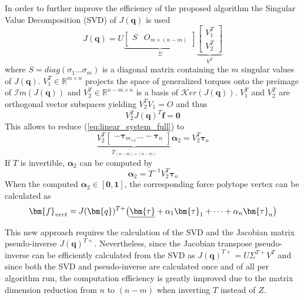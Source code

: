 In order to further improve the efficiency of the proposed algorithm the Singular Value Decomposition (SVD) \cite{klema_singular_1980} of $J(\bm{q})$ is used
\begin{equation}
     J(\bm{q}) =  U  \underbrace{\begin{bmatrix}S & O_{m\times (n-m)}\end{bmatrix}}_{\Sigma}\underbrace{\begin{bmatrix}V_1^T \\ V_2^T \end{bmatrix}}_{V^T}
\end{equation}
where $S= diag( \sigma_1 \dots \sigma_m)$ is a diagonal matrix containing the $m$ singular values of $J(\bm{q})$. $V_1^T \in \mathbb{R}^{m \times n}$ projects the space of generalized torques onto the preimage of $\mathcal{I}m(J(\bm{q}))$ and $V_2^T \in \mathbb{R}^{n-m \times n}$ is a basis of $\mathcal{K}er(J(\bm{q}))$. $V_1^T$ and $V_2^T$ are orthogonal vector subspaces yielding $V_2^T V_1 = O$ and thus 
\begin{equation}
    V_2^T J(\bm{q})^T\bm{f} = \bm{0}
\end{equation}
This allows to reduce (\ref{eq:linear_system_full}) to
\begin{equation}
    \underbrace{V_2^T\begin{bmatrix}-\bm{\tau}_{m}_{+1} \dots -\bm{\tau}_{n} \end{bmatrix}}_{T_{(n-m)\times (n-m)}} \bm{\alpha}_2 = V_2^T\bm{\tau}_o
    \label{eq:linear_system_svd}
\end{equation}
If $T$ is invertible, $\bm{\alpha}_2$ can be computed by
\begin{equation}
\bm{\alpha}_2 = T^{-1}V_2^T\bm{\tau}_o
\end{equation}
When the computed $\bm{\alpha}_2 \in [\bm{0},\bm{1}]$,  the corresponding force polytope vertex can be calculated as
\begin{equation}
    \bm{f}_{vert} = J(\bm{q})^{T+} \big( \unum{\bm{\tau}} + \alpha_1\bm{\tau}_{1} +\dots+\alpha_n\bm{\tau}_{n}\big)
\end{equation}

This new approach requires the calculation of the SVD and the Jacobian matrix pseudo-inverse $J(\bm{q})^{T+}$. Nevertheless, since the Jacobian transpose pseudo-inverse can be efficiently calculated from the SVD as $J(\bm{q})^{T+} = U\Sigma^{T+}V^T$
and since both the SVD and pseudo-inverse are calculated once and of all per algorithm run, the computation efficiency is greatly improved due to the matrix dimension reduction from $n$ to $(n-m)$ when inverting $T$ instead of $Z$.


